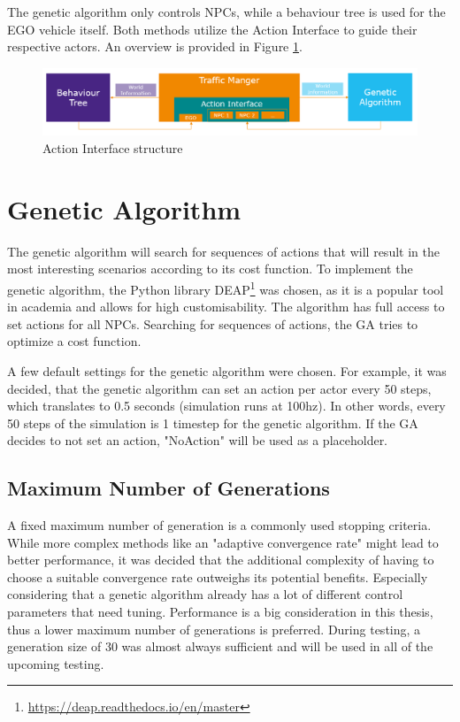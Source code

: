 The genetic algorithm only controls NPCs, while a behaviour tree is used for the EGO vehicle itself. Both methods utilize the Action Interface to guide their respective actors. An overview is provided in Figure \ref{fig:implementation:traffic_manager_structure}.

\begin{figure}[ht] 
	\includegraphics[width=1\linewidth]{figures/tm_structure}
	\caption{Action Interface structure}
	\label{fig:implementation:traffic_manager_structure}
\end{figure}

\section{Genetic Algorithm}
The genetic algorithm will search for sequences of actions that will result in the most interesting scenarios according to its cost function. To implement the genetic algorithm, the Python library DEAP\footnote{\url{https://deap.readthedocs.io/en/master}} was chosen, as it is a popular tool in academia and allows for high customisability. The algorithm has full access to set actions for all NPCs. Searching for sequences of actions, the GA tries to optimize a cost function.

A few default settings for the genetic algorithm were chosen. For example, it was decided, that the genetic algorithm can set an action per actor every 50 steps, which translates to 0.5 seconds (simulation runs at 100hz). In other words, every 50 steps of the simulation is 1 timestep for the genetic algorithm. If the GA decides to not set an action, "NoAction" will be used as a placeholder.

\subsection{Maximum Number of Generations}
A fixed maximum number of generation is a commonly used stopping criteria. While more complex methods like an "adaptive convergence rate" might lead to better performance, it was decided that the additional complexity of having to choose a suitable convergence rate outweighs its potential benefits. Especially considering that a genetic algorithm already has a lot of different control parameters that need tuning. Performance is a big consideration in this thesis, thus a lower maximum number of generations is preferred. During testing, a generation size of 30 was almost always sufficient and will be used in all of the upcoming testing.

